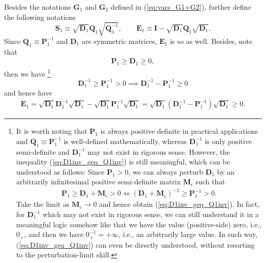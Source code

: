 \documentclass[12pt]{article}
\begin{document}
Besides the notations $\mathbf{G}_1$ and $\mathbf{G}_2$ defined in (\ref{eq:vars_G1+G2}), further define the following notations
\begin{equation}  \label{eq:vars_S1+E1}
\mathbf{S}_1 \equiv \sqrt{\mathbf{D}_1} \mathbf{Q}_1 \sqrt{\mathbf{Q}_3^{-1}}, \qquad \mathbf{E}_1 \equiv \mathbf{I} - \sqrt{\mathbf{D}_1} \mathbf{Q}_1 \sqrt{\mathbf{D}_1}.
\end{equation}
Since $\mathbf{Q}_1 \equiv \mathbf{P}_1^{-1}$ and $\mathbf{D}_1$ are symmetric matrices, $\mathbf{E}_1$ is so as well. Besides, note that
\begin{align*}
\mathbf{P}_1 \geq \mathbf{D}_1 \geq 0,
\end{align*}
then we have
\footnote{It is worth noting that $\mathbf{P}_1$ is always positive definite in practical applications and $\mathbf{Q}_1 \equiv \mathbf{P}_1^{-1}$ is well-defined mathematically, whereas $\mathbf{D}_1^{-1}$ is only positive semi-definite and $\mathbf{D}_1^{-1}$ may not exist in rigorous sense. However, the inequality (\ref{eq:D1inv_geq_Q1inv}) is still meaningful, which can be understood as follows: Since $\mathbf{P}_1 > 0$, we can always perturb $\mathbf{D}_1$ by an arbitrarily infinitesimal positive semi-definite matrix $\mathbf{M}_{\epsilon}$ such that
\begin{align*}
\mathbf{P}_1 \geq \mathbf{D}_1 + \mathbf{M}_{\epsilon} > 0 \iff (\mathbf{D}_1 + \mathbf{M}_{\epsilon})^{-1} \geq \mathbf{P}_1^{-1} > 0.
\end{align*}
Take the limit as $\mathbf{M}_{\epsilon} \to 0$ and hence obtain (\ref{eq:D1inv_geq_Q1inv}). In fact, for $\mathbf{D}_1^{-1}$ which may not exist in rigorous sense, we can still understand it in a meaningful logic somehow like that we have the value (positive-side) zero, i.e., $0_+$, and then we have $0_+^{-1} = +\infty$, i.e., an arbitrarily large value. In such way, (\ref{eq:D1inv_geq_Q1inv}) can even be directly understood, without resorting to the perturbation-limit skill.}
\begin{equation}  \label{eq:D1inv_geq_Q1inv}
\mathbf{D}_1^{-1} \geq \mathbf{P}_1^{-1} > 0  \implies \mathbf{D}_1^{-1} - \mathbf{P}_1^{-1} \geq 0
\end{equation}
and hence have
\begin{align}  \label{eq:vars_E1_pos}
\mathbf{E}_1 = \sqrt{\mathbf{D}_1} \mathbf{D}_1^{-1} \sqrt{\mathbf{D}_1} - \sqrt{\mathbf{D}_1} \mathbf{P}_1^{-1} \sqrt{\mathbf{D}_1} = \sqrt{\mathbf{D}_1} (\mathbf{D}_1^{-1} - \mathbf{P}_1^{-1}) \sqrt{\mathbf{D}_1} \geq 0.
\end{align}
\end{document}

